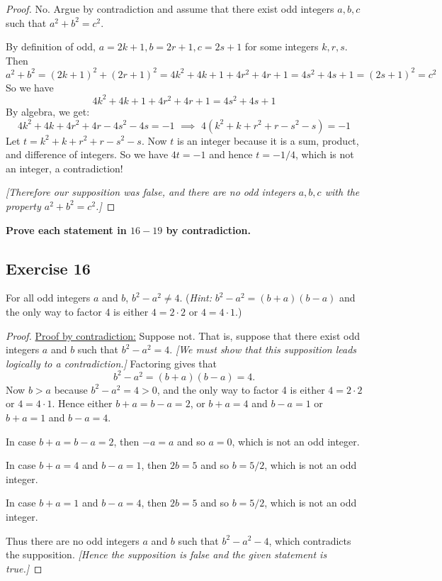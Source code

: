 \documentclass[14pt]{extarticle}
\newcommand{\cy}{\color{cyan}}
\begin{document}
\begin{proof}
    No. Argue by contradiction and assume that there exist odd integers $a,b,c$ such that $a^2 + b^2 = c^2$.

    By definition of odd, $a = 2k+1, b = 2r + 1, c = 2s+1$ for some integers $k,r,s$. Then
    \[
        a^2 + b^2 = (2k+1)^2 + (2r+1)^2 = 4k^2+4k+1+4r^2+4r+1 = 4s^2+4s+1 = (2s+1)^2 = c^2
    \]
    So we have
    \[
        4k^2+4k+1+4r^2+4r+1 = 4s^2+4s+1
    \]
    By algebra, we get:
    \[
        4k^2+4k+4r^2+4r-4s^2-4s = -1 \,\, \implies \,\, 4(k^2+k+r^2+r-s^2-s) = -1
    \]
    Let $t = k^2+k+r^2+r-s^2-s$. Now $t$ is an integer because it is a sum, product, and difference of integers. So we have $4t = -1$ and hence $t = -1/4$, which is not an integer, a contradiction!

    {\it [Therefore our supposition was false, and there are no odd integers $a,b,c$ with the property $a^2 + b^2 = c^2$.]}
\end{proof}

{\bf \cy Prove each statement in $16-19$ by contradiction.}

\subsection{Exercise 16}
For all odd integers $a$ and $b$, $b^2 - a^2 \neq 4$. ({\it Hint:} $b^2 - a^2 = (b + a)(b - a)$ and the only way to factor 4 is either $4 = 2\cdot2$ or $4 = 4\cdot1$.)

\begin{proof}
    \underline{Proof by contradiction:} Suppose not. That is, suppose that there exist odd integers $a$ and $b$ such that $b^2 - a^2 = 4$. {\it [We must show that this supposition leads logically to a contradiction.]} Factoring gives that
    \[
        b^2 - a^2 = (b + a)(b - a) = 4.
    \]
    Now $b > a$ because $b^2 - a^2 = 4 > 0$, and the only way to factor 4 is either $4 = 2\cdot2$ or $4 = 4\cdot1$. Hence either $b + a = b - a = 2$, or $b + a = 4$ and $b - a = 1$ or $b + a = 1$ and $b - a = 4$.

    In case $b + a = b - a = 2$, then $-a = a$ and so $a = 0$, which is not an odd integer.

    In case $b + a = 4$ and $b - a = 1$, then $2b = 5$ and so $b = 5/2$, which is not an odd integer.

    In case $b + a = 1$ and $b - a = 4$, then $2b = 5$ and so $b = 5/2$, which is not an odd integer.

    Thus there are no odd integers $a$ and $b$ such that $b^2 - a^2 - 4$, which contradicts the supposition. {\it [Hence the supposition is false and the given statement is true.]}
\end{proof}
\end{document}

